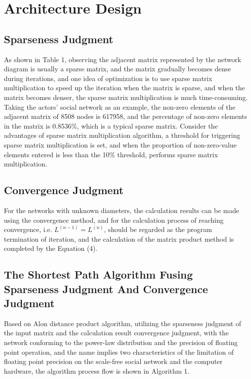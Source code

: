 \documentclass[review]{cvpr}
\begin{document}
\section{Architecture Design}

\subsection{Sparseness Judgment}

As shown in Table 1, observing the adjacent matrix represented by the network diagram is usually a sparse matrix, and the matrix gradually becomes dense during iterations,
and one idea of optimization is to use sparse matrix multiplication to speed up the iteration when the matrix is sparse, and when the matrix becomes denser, the sparse matrix multiplication is much time-consuming.
Taking the actors' social network as an example, the non-zero elements of the adjacent matrix of 8508 nodes is 617958, and the percentage of non-zero elements in the matrix is 0.8536\%, which is a typical sparse matrix.
Consider the advantages of sparse matrix multiplication algorithm, a threshold for triggering sparse matrix multiplication is set,
and when the proportion of non-zero-value elements entered is less than the 10\% threshold, performs sparse matrix multiplication.

\subsection{Convergence Judgment}

For the networks with unknown diameters, the calculation results can be made using the convergence method, and for the calculation process of reaching convergence,
i.e. $L^{(n-1)}=L^{(n)}$, should be regarded as the program termination of iteration, and the calculation of the matrix product method is completed by the Equation (4).

\subsection{The Shortest Path Algorithm Fusing Sparseness Judgment And Convergence Judgment}

Based on Alon \etal distance product algorithm, utilizing the sparseness judgment of the input matrix and the calculation result convergence judgment,
with the network conforming to the power-law distribution and the precision of floating point operation, and the name implies two characteristics of the limitation
of floating point precision on the scale-free social network and the computer hardware, the algorithm process flow is shown in Algorithm 1.
\end{document}
